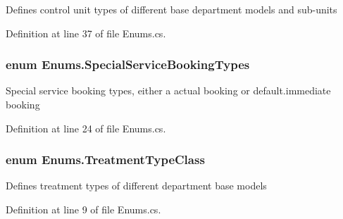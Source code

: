 Defines control unit types of different base department models and sub-\/units 



Definition at line 37 of file Enums.\+cs.

\subsubsection[{\texorpdfstring{Special\+Service\+Booking\+Types}{SpecialServiceBookingTypes}}]{\setlength{\rightskip}{0pt plus 5cm}enum {\bf Enums.\+Special\+Service\+Booking\+Types}\hspace{0.3cm}{\ttfamily [strong]}}\hypertarget{namespace_enums_a983d5bd1d6201551a5cc9c34c53d1af6}{}\label{namespace_enums_a983d5bd1d6201551a5cc9c34c53d1af6}


Special service booking types, either a actual booking or default.\+immediate booking 



Definition at line 24 of file Enums.\+cs.

\subsubsection[{\texorpdfstring{Treatment\+Type\+Class}{TreatmentTypeClass}}]{\setlength{\rightskip}{0pt plus 5cm}enum {\bf Enums.\+Treatment\+Type\+Class}\hspace{0.3cm}{\ttfamily [strong]}}\hypertarget{namespace_enums_a818a2209a7496285390744fe2e319e3d}{}\label{namespace_enums_a818a2209a7496285390744fe2e319e3d}


Defines treatment types of different department base models 



Definition at line 9 of file Enums.\+cs.

